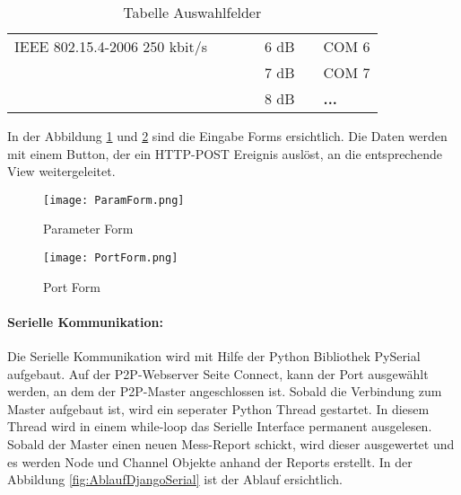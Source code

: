 \begin{table}[H]
\begin{adjustbox}{width=1\textwidth}
\begin{tabular}{@{}llll|l|l|l|@{}}
			\multicolumn{1}{|l|}{IEEE 802.15.4-2006 250 kbit/s} &                       &                                               &  & 6 dB                                           &  & COM 6                                      \\ \cmidrule(r){1-1} \cmidrule(lr){5-5} \cmidrule(l){7-7} 
			&                       &                                               &  & 7 dB                                           &  & COM 7                                      \\ \cmidrule(lr){5-5} \cmidrule(l){7-7} 
			&                       &                                               &  & 8 dB                                           &  & \textbf{...}                               \\ \cmidrule(lr){5-5} \cmidrule(l){7-7} 
		\end{tabular}
	\end{adjustbox}
	\caption{Tabelle Auswahlfelder}
	\label{table:TabelleAuswahlfelder}
\end{table}

In der Abbildung \ref{fig:ParamForm} und \ref{fig:PortForm} sind die Eingabe Forms ersichtlich. Die Daten werden mit einem Button, der ein HTTP-POST Ereignis auslöst, an die entsprechende View weitergeleitet.

\begin{figure} [H]
	\centering
	\texttt{[image: ParamForm.png]}
	\caption{Parameter Form}
	\label{fig:ParamForm}
\end{figure}


\begin{figure} [H]
	\centering
	\texttt{[image: PortForm.png]}
	\caption{Port Form}
	\label{fig:PortForm}
\end{figure}

\newpage

\paragraph{Serielle Kommunikation: }\label{par:SerielleKommunikation}
Die Serielle Kommunikation wird mit Hilfe der Python Bibliothek PySerial aufgebaut. Auf der P2P-Webserver Seite Connect, kann der Port ausgewählt werden, an dem der P2P-Master angeschlossen ist. Sobald die Verbindung zum Master aufgebaut ist, wird ein seperater Python Thread gestartet. In diesem Thread wird in einem while-loop das Serielle Interface permanent ausgelesen. Sobald der Master einen neuen Mess-Report schickt, wird dieser ausgewertet und es werden Node und Channel Objekte anhand der Reports erstellt. In der Abbildung \ref{fig:AblaufDjangoSerial} ist der Ablauf ersichtlich.

